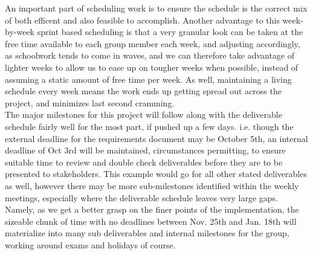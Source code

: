 \documentclass{article}
\begin{document}
	An important part of scheduling work is to ensure the schedule is the correct mix of both efficent and also feasible to accomplish. Another advantage to this week-by-week
sprint based scheduling is that a very granular look can be taken at the free time available to each group member each week, and adjusting accordingly, as schoolwork tends
to come in waves, and we can therefore take advantage of lighter weeks to allow us to ease up on tougher weeks when possible, instead of assuming a static amount of free
time per week. As well, maintaining a living schedule every week means the work ends up getting spread out across the project, and minimizes last second cramming.\\

	The major milestones for this project will follow along with the deliverable schedule fairly well for the most part, if pushed up a few days. i.e. though the external deadline
for the requirements document may be October 5th, an internal deadline of Oct 3rd will be maintained, circumstances permitting, to ensure suitable time to review and double
check deliverables before they are to be presented to stakeholders. This example would go for all other stated deliverables as well, however there may be more sub-milestones
identified within the weekly meetings, especially where the deliverable schedule leaves very large gaps. Namely, as we get a better grasp on the finer points of the 
implementation, the sizeable chunk of time with no deadlines between Nov. 25th and Jan. 18th will materialize into many sub deliverables and internal milestones for the group,
working around exams and holidays of course. 
\end{document}

